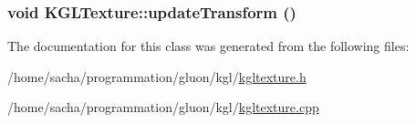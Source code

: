 \hypertarget{class_k_g_l_texture_67cf0613953a0d7949e85f39c30d2594}{
\subsubsection[{updateTransform}]{\setlength{\rightskip}{0pt plus 5cm}void KGLTexture::updateTransform ()}}
\label{class_k_g_l_texture_67cf0613953a0d7949e85f39c30d2594}




The documentation for this class was generated from the following files:\begin{CompactItemize}
\item 
/home/sacha/programmation/gluon/kgl/\hyperlink{kgltexture_8h}{kgltexture.h}\item 
/home/sacha/programmation/gluon/kgl/\hyperlink{kgltexture_8cpp}{kgltexture.cpp}\end{CompactItemize}
